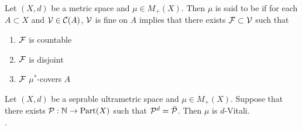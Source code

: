 \documentclass{book}
\begin{document}
	\begin{defn} 
		Let $(X, d)$ be a metric space and $\mu \in M_+(X)$. Then $\mu$ is said to be  if for each $A \subset X$ and $\mathcal{V} \in \mathcal{C}(A)$, $\mathcal{V}$ is fine on $A$ implies that there exists $\mathcal{F} \subset \mathcal{V}$ such that 
		\begin{enumerate}
			\item $\mathcal{F}$ is countable
			\item $\mathcal{F}$ is disjoint
			\item $\mathcal{F}$ $\mu^*$-covers $A$ 
		\end{enumerate}
	\end{defn}
	
	\begin{note}
	\end{note}
	
	\begin{ex} 
		Let $(X, d)$ be a seprable ultrametric space and $\mu \in M_+(X)$. Suppose that there exists $\mathcal{P}: \mathbb{N} \rightarrow \operatorname*{\text{Part}}(X)$ such that $\mathcal{P}^d = \bar{\mathcal{P}}$. Then $\mu$ is $d$-Vitali. \\ 
		.
	\end{ex}
	
\end{document}
